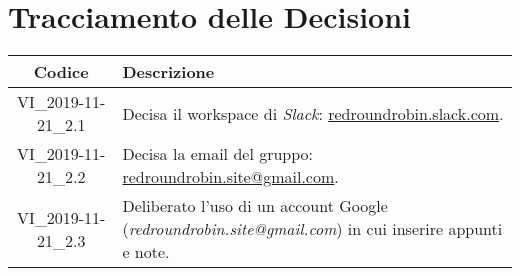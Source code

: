 \section*{Tracciamento delle Decisioni}

\begin{center}
	\begin{longtable}{|c|p{12.25cm}|}
	\hline
	\rowcolor{lighter-grayer}
	\textbf{Codice} & \textbf{Descrizione} \\
	\hline
	\endfirsthead

	\hline
	VI\_2019-11-21\_2.1 & Decisa il workspace di \textit{Slack}: \href{http://redroundrobin.slack.com}{redroundrobin.slack.com}. \\
	\hline
	VI\_2019-11-21\_2.2 & Decisa la email del gruppo: \href{mailto:redroundrobin.site@gmail.com}{redroundrobin.site@gmail.com}. \\
	\hline
	VI\_2019-11-21\_2.3 & Deliberato l'uso di un account Google (\textit{redroundrobin.site@gmail.com}) in cui inserire appunti e note. \\
	\hline

	\end{longtable}
\end{center}
